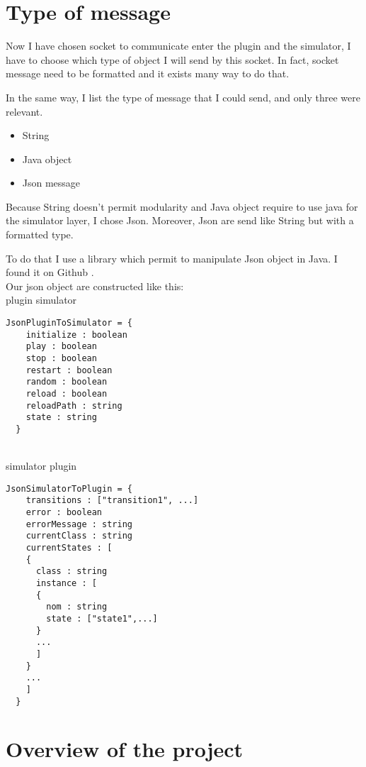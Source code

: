 \section{Type of message}

Now I have chosen socket to communicate enter the plugin and the simulator, I have to choose which type of object I will send by this socket. In fact, socket message need to be formatted and it exists many way to do that.

In the same way, I list the type of message that I could send, and only three were relevant.

\begin{itemize}
\item String
\item Java object
\item Json message
\end{itemize}

Because String doesn't permit modularity and Java object require to use java for the simulator layer, I chose Json. Moreover, Json are send like String but with a formatted type.

To do that I use a library which permit to manipulate Json object in Java. I found it on Github \cite{json}.
~\\

Our json object are constructed like this:
~\\

plugin \overrightarrow{} simulator
\begin{lstlisting}[style=json]
  JsonPluginToSimulator = {
    initialize : boolean
    play : boolean
    stop : boolean
    restart : boolean
    random : boolean
    reload : boolean
    reloadPath : string
    state : string
  }
\end{lstlisting}

~\\

simulator \overrightarrow{} plugin
\begin{lstlisting}[style=json]
  JsonSimulatorToPlugin = {
    transitions : ["transition1", ...]
    error : boolean
    errorMessage : string
    currentClass : string
    currentStates : [
    {
      class : string
      instance : [
      {
        nom : string
        state : ["state1",...]
      }
      ...
      ]
    }
    ...
    ]
  }

\end{lstlisting}


\section{Overview of the project}


